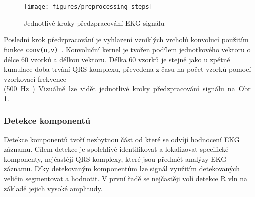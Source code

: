 \begin{figure}[h!]
    \begin{center}
        \texttt{[image: figures/preprocessing\_steps]}
        \caption{Jednotlivé kroky předzpracování EKG signálu}
        \label{fig:preprocessing_steps}
    \end{center}
\end{figure}

Poslední krok předzpracování je vyhlazení vzniklých vrcholů konvolucí použitím
funkce \texttt{conv(u,v)}~\cite{matlabCONV}. Konvoluční kernel je tvořen podílem
jednotkového vektoru o délce 60 vzorků a délkou vektoru. Délka 60 vzorků je
stejně jako u zpětné kumulace doba trvání QRS komplexu, převedena z času na
počet vzorků pomocí vzorkovací frekvence (500~\si\Hz). Vizuálně lze vidět
jednotlivé kroky předzpracování signálu na Obr.~\ref{fig:preprocessing_steps}.

\subsubsection{Detekce komponentů}
\label{section:components_detection}
Detekce komponentů tvoří nezbytnou část od které se odvíjí hodnocení EKG
záznamu. Cílem detekce je spolehlivě identifikovat a lokalizovat specifické
komponenty, nejčastěji QRS komplexy, které jsou předmět analýzy EKG záznamu.
Díky detekovaným komponentům lze signál využitím detekovaných veličin
segmentovat a hodnotit. V první řadě se nejčastěji volí detekce R vln na základě
jejich vysoké amplitudy.

